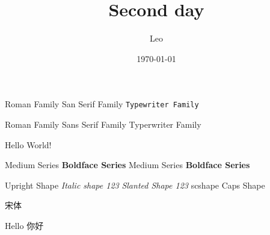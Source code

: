 \documentclass{article}[12pt]
\title{Second day}
\author{Leo}
\date{\today}
\begin{document}
\maketitle

\textrm{Roman Family} \textsf{San Serif Family} \texttt{Typewriter Family}


{\rmfamily Roman Family} {\sffamily Sans Serif Family} {\ttfamily Typerwriter Family}

\sffamily Hello World!

\textmd{Medium Series} \textbf{Boldface Series}
{\mdseries Medium Series} {\bfseries Boldface Series}

\textup{Upright Shape} \textit{Italic shape 123}
{\slshape Slanted Shape 123} {scshape Caps Shape}

{\songti 宋体}  

{\tiny Hello}
{你好}
\end{document}
